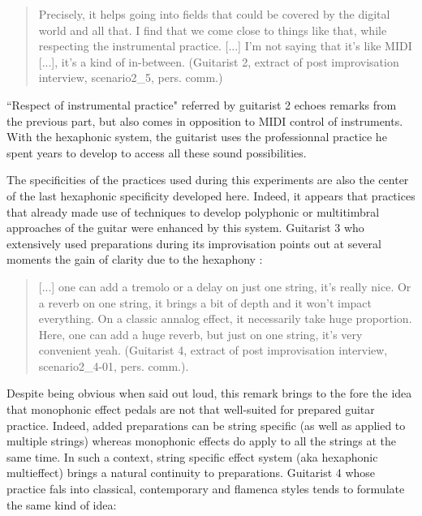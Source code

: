 \documentclass{article}
\begin{document}
\begin{quote}
Precisely, it helps going into fields that could be covered by the digital world and all that.  I find that we come close to things like that, while respecting the instrumental practice.  [...] I'm not saying that it's like MIDI [...], it's a kind of in-between.  (Guitarist 2, extract of post improvisation interview, scenario2\_5, pers. comm.)
\end{quote}

``Respect of instrumental practice" referred by guitarist 2 echoes remarks from the previous part, but also comes in opposition to MIDI control of instruments. With the hexaphonic system, the guitarist uses the professionnal practice he spent years to develop to access all these sound possibilities.

The specificities of the practices used during this experiments are also the center of the last hexaphonic specificity developed here. Indeed, it appears that practices that already made use of techniques to develop polyphonic or multitimbral approaches of the guitar were enhanced by this system. 
Guitarist 3 who extensively used preparations during its improvisation points out at several moments the gain of clarity due to the hexaphony : 

\begin{quote}
[...] one can add a tremolo or a delay on just one string, it's really nice. Or a reverb on one string, it brings a bit of depth and it won't impact everything. On a classic annalog effect, it necessarily take huge proportion. Here, one can add a huge reverb, but just on one string, it's very convenient yeah. (Guitarist 4, extract of post improvisation interview, scenario2\_4-01, pers. comm.).
\end{quote}

Despite being obvious when said out loud, this remark brings to the fore the idea that monophonic effect pedals are not that well-suited for prepared guitar practice. Indeed, added preparations can be string specific (as well as applied to multiple strings) whereas monophonic effects do apply to all the strings at the same time.
In such a context, string specific effect system (aka hexaphonic multieffect) brings a natural continuity to preparations.
Guitarist 4 whose practice fals into classical, contemporary and flamenca styles tends to formulate the same kind of idea: 
\end{document}
